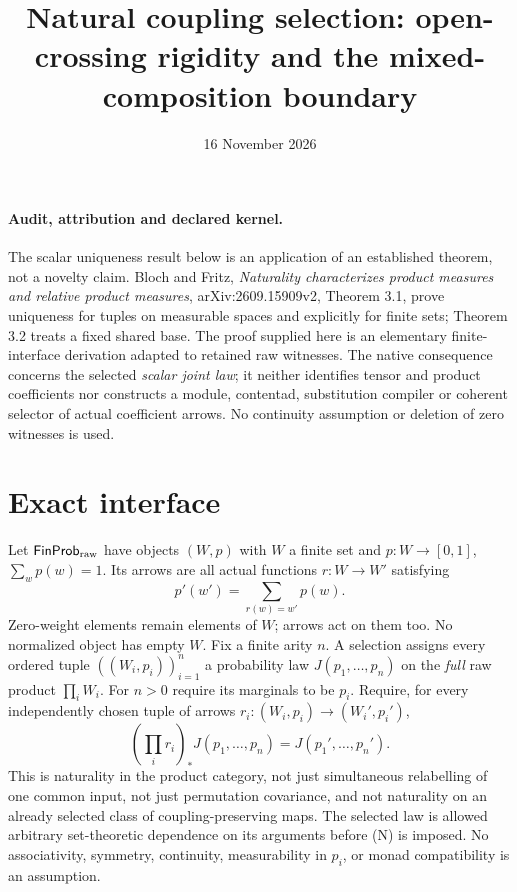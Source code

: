 \documentclass{article}
\title{Natural coupling selection: open-crossing rigidity and the mixed-composition boundary}
\date{16 November 2026}
\begin{document}
\maketitle
\paragraph{Audit, attribution and declared kernel.}
The scalar uniqueness result below is an application of an established theorem,
not a novelty claim. Bloch and Fritz, \emph{Naturality characterizes product
measures and relative product measures}, arXiv:2609.15909v2, Theorem 3.1,
prove uniqueness for tuples on measurable spaces and explicitly for finite
sets; Theorem 3.2 treats a fixed shared base. The proof supplied here is an
elementary finite-interface derivation adapted to retained raw witnesses.
The native consequence concerns the selected \emph{scalar joint law}; it
neither identifies tensor and product coefficients nor constructs a module,
contentad, substitution compiler or coherent selector of actual coefficient
arrows. No continuity assumption or deletion of zero witnesses is used.

\section{Exact interface}
Let $\mathsf{FinProb}_{\rm raw}$ have objects $(W,p)$ with $W$ a finite set
and $p:W\to[0,1]$, $\sum_wp(w)=1$. Its arrows are all actual functions
$r:W\to W'$ satisfying
\[
 p'(w')=\sum_{r(w)=w'}p(w).
\]
Zero-weight elements remain elements of $W$; arrows act on them too.
No normalized object has empty $W$. Fix a finite arity $n$.
A selection assigns every ordered tuple $((W_i,p_i))_{i=1}^n$ a probability
law $J(p_1,\ldots,p_n)$ on the \emph{full} raw product $\prod_iW_i$.
For $n>0$ require its marginals to be $p_i$. Require, for every independently
chosen tuple of arrows $r_i:(W_i,p_i)\to(W_i',p_i')$,
\[
 (\prod_i r_i)_*J(p_1,\ldots,p_n)=J(p_1',\ldots,p_n'). \tag{N}
\]
This is naturality in the product category, not just simultaneous relabelling
of one common input, not just permutation covariance, and not naturality on
an already selected class of coupling-preserving maps. The selected law
is allowed arbitrary set-theoretic dependence on its arguments before (N)
is imposed. No associativity, symmetry, continuity, measurability in $p_i$,
or monad compatibility is an assumption.
\end{document}
